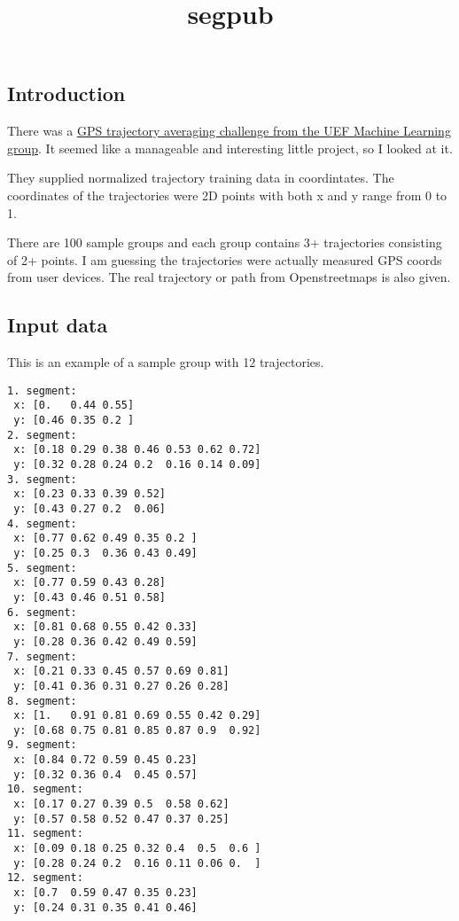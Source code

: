 \documentclass[11pt]{article}
\title{segpub}
\begin{document}
    
    
    \maketitle
    
    

    
    \subsection{Introduction}\label{introduction}

There was a \href{http://cs.uef.fi/sipu/segments/}{GPS trajectory
averaging challenge from the UEF Machine Learning group}. It seemed like
a manageable and interesting little project, so I looked at it.

They supplied normalized trajectory training data in coordintates. The
coordinates of the trajectories were 2D points with both x and y range
from 0 to 1.

There are 100 sample groups and each group contains 3+ trajectories
consisting of 2+ points. I am guessing the trajectories were actually
measured GPS coords from user devices. The real trajectory or path from
Openstreetmaps is also given.

\subsection{Input data}\label{input-data}

This is an example of a sample group with 12 trajectories.

\begin{verbatim}
1. segment:
 x: [0.   0.44 0.55]
 y: [0.46 0.35 0.2 ]
2. segment:
 x: [0.18 0.29 0.38 0.46 0.53 0.62 0.72]
 y: [0.32 0.28 0.24 0.2  0.16 0.14 0.09]
3. segment:
 x: [0.23 0.33 0.39 0.52]
 y: [0.43 0.27 0.2  0.06]
4. segment:
 x: [0.77 0.62 0.49 0.35 0.2 ]
 y: [0.25 0.3  0.36 0.43 0.49]
5. segment:
 x: [0.77 0.59 0.43 0.28]
 y: [0.43 0.46 0.51 0.58]
6. segment:
 x: [0.81 0.68 0.55 0.42 0.33]
 y: [0.28 0.36 0.42 0.49 0.59]
7. segment:
 x: [0.21 0.33 0.45 0.57 0.69 0.81]
 y: [0.41 0.36 0.31 0.27 0.26 0.28]
8. segment:
 x: [1.   0.91 0.81 0.69 0.55 0.42 0.29]
 y: [0.68 0.75 0.81 0.85 0.87 0.9  0.92]
9. segment:
 x: [0.84 0.72 0.59 0.45 0.23]
 y: [0.32 0.36 0.4  0.45 0.57]
10. segment:
 x: [0.17 0.27 0.39 0.5  0.58 0.62]
 y: [0.57 0.58 0.52 0.47 0.37 0.25]
11. segment:
 x: [0.09 0.18 0.25 0.32 0.4  0.5  0.6 ]
 y: [0.28 0.24 0.2  0.16 0.11 0.06 0.  ]
12. segment:
 x: [0.7  0.59 0.47 0.35 0.23]
 y: [0.24 0.31 0.35 0.41 0.46]
\end{verbatim}
\end{document}
